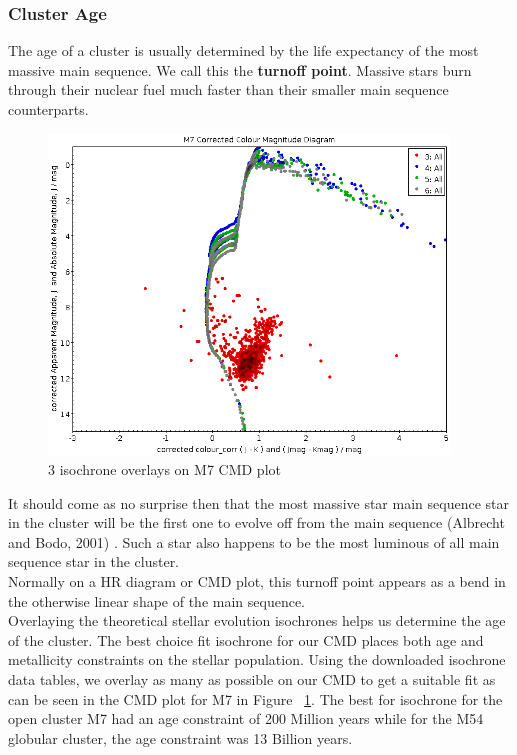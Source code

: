 \documentclass[12pt]{article}
\begin{document}
		\subsubsection{Cluster Age}
		The age of a cluster is usually determined by the life expectancy of the most massive main sequence. We call this the \textbf{turnoff point}. Massive stars burn through their nuclear fuel much faster than their smaller main sequence counterparts.
		\begin{figure}[h!]%
			\centering
			\includegraphics[width=0.95\textwidth, keepaspectratio]{m7_cmd_all_fits}
			\caption{3 isochrone overlays on M7 CMD plot}
			\label{fig: m7_cmd_all_fits}
		\end{figure}
		It should come as no surprise then that the most massive star main sequence star in the cluster will be the first one to evolve off from the main sequence (Albrecht and Bodo, 2001) \cite{albrecht}. Such a star also happens to be the most luminous of all main sequence star in the cluster.\\
		Normally on a HR diagram or CMD plot, this turnoff point appears as a bend in the otherwise linear shape of the main sequence.\\
		Overlaying the theoretical stellar evolution isochrones helps us determine the age of the cluster. The best choice fit isochrone for our CMD places both age and metallicity constraints on the stellar population. Using the downloaded isochrone data tables, we overlay as many as possible on our CMD to get a suitable fit as can be seen in the CMD plot for M7 in Figure ~\ref{fig: m7_cmd_all_fits}. The best for isochrone for the open cluster M7 had an age constraint of 200 Million years while for the M54 globular cluster, the age constraint was 13 Billion years.
		
\end{document}
